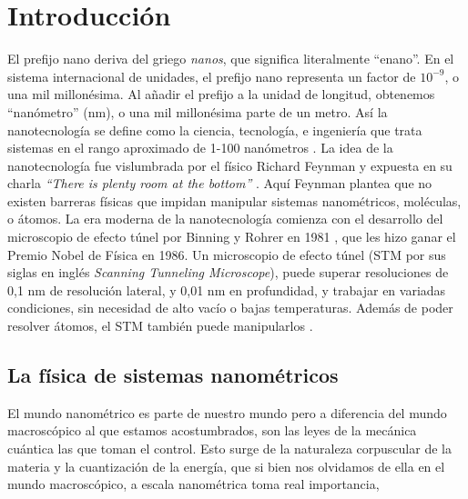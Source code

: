 \chapter*{Introducción}


El prefijo nano deriva del griego \emph{nanos}, que significa literalmente ``enano''. En el sistema internacional de unidades, el prefijo nano representa un factor de $\mathrm{10^{-9}}$, o una mil millonésima. Al añadir el prefijo a la unidad de longitud, obtenemos ``nanómetro'' (nm), o una mil millonésima parte de un metro. Así la nanotecnología se define como la ciencia, tecnología, e ingeniería que trata sistemas en el rango aproximado de 1-100 nanómetros \citep{Haick2013,Gressler2013}.
La idea de la nanotecnología fue vislumbrada por el físico Richard Feynman y expuesta en su charla \emph{``There is plenty room at the bottom''} \citep{Feynman1960}. Aquí Feynman plantea que no existen barreras físicas que impidan manipular sistemas nanométricos, moléculas, o átomos. La era moderna de la nanotecnología comienza con el desarrollo del microscopio de efecto túnel por Binning y Rohrer en 1981 \citep{Binnig1982}, que les hizo ganar el Premio Nobel de Física en 1986. Un microscopio de efecto túnel (STM por sus siglas en inglés \emph{Scanning Tunneling Microscope}), puede superar resoluciones de 0,1 nm de resolución lateral, y 0,01 nm en profundidad, y trabajar en variadas condiciones, sin necesidad de alto vacío o bajas temperaturas. Además de poder resolver átomos, el STM también puede manipularlos \citep{Chen2008}.

\section*{La física de sistemas nanométricos}
El mundo nanométrico es parte de nuestro mundo pero a diferencia del mundo macroscópico al que estamos acostumbrados, son las leyes de la mecánica cuántica las que toman el control. Esto surge de la naturaleza corpuscular de la materia y la cuantización de la energía, que si bien nos olvidamos de ella en el mundo macroscópico, a escala nanométrica toma real importancia, 
